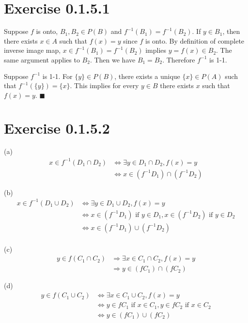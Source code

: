 \documentclass[12pt]{article}
\begin{document}
\section*{Exercise 0.1.5.1}
Suppose $f$ is onto, $B_1, B_2 \in P(B)$ and $f^{-1}(B_1) = f^{-1}(B_2)$. If $y \in B_1$, then there exists $x \in A$ such that $f(x) = y$ since $f$ is onto. By definition of complete inverse image map, $ x \in   f^{-1}(B_1) = f^{-1}(B_2)$ implies $ y = f(x) \in B_2$. The same argument applies to $B_2$. Then we have $B_1 = B_2$. Therefore $f^{-1}$ is 1-1. 

Suppose $f^{-1}$ is 1-1. For $\{y\} \in P(B)$, there exists a unique $\{x\} \in P(A)$ such that $f^{-1}(\{y\}) = \{x\}$. This implies for every $y \in B$ there exists $x$ such that $f(x) = y$.  $\blacksquare$

\section*{Exercise 0.1.5.2}
(a) $$\begin{aligned}
	x \in f^{-1}(D_1 \cap D_2) &\Leftrightarrow \exists y \in D_1 \cap D_2, f(x) = y  \\
	&\Leftrightarrow x \in (f^{-1}D_1) \cap (f^{-1}D_2)	    
\end{aligned}
$$

(b) $$
\begin{aligned}
	x \in f^{-1}(D_1 \cup D_2) &\Leftrightarrow \exists y \in D_1 \cup D_2, f(x) = y  \\
	&\Leftrightarrow x \in (f^{-1}D_1) \mbox{ if } y \in D_1, x \in (f^{-1}D_2) \mbox{ if } y \in D_2 \\
	&\Leftrightarrow x \in (f^{-1}D_1) \cup (f^{-1}D_2)  \\
\end{aligned}
$$

(c) $$\begin{aligned}
	y \in f(C_1 \cap C_2) &\Rightarrow \exists x \in C_1 \cap C_2, f(x) = y \\
	&\Rightarrow y \in (fC_1) \cap (fC_2)
\end{aligned}
$$

(d) $$\begin{aligned}
	y \in f(C_1 \cup C_2) &\Leftrightarrow \exists x \in C_1 \cup C_2, f(x) = y \\
	&\Leftrightarrow y \in fC_1 \mbox{ if } x \in C_1 ,  y \in fC_2 \mbox{ if } x \in C_2 \\
	&\Leftrightarrow y \in (fC_1) \cup (fC_2)
\end{aligned}
$$
\end{document}

